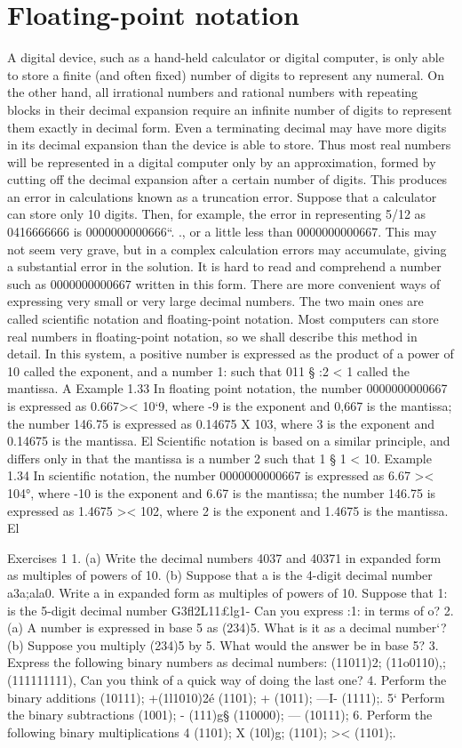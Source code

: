 \section{Floating-point notation}
A digital device, such as a hand-held calculator or digital computer, is only able to store a ﬁnite
(and often ﬁxed) number of digits to represent any numeral. On the other hand, all irrational
numbers and rational numbers with repeating blocks in their decimal expansion require an inﬁnite
number of digits to represent them exactly in decimal form. Even a terminating decimal may have
more digits in its decimal expansion than the device is able to store. Thus most real numbers will
be represented in a digital computer only by an approximation, formed by cutting off the decimal
expansion after a certain number of digits. This produces an error in calculations known as a
truncation error.
Suppose that a calculator can store only 10 digits. Then, for example, the error in representing
5/12 as 0416666666 is 0000000000666“. ., or a little less than 0000000000667. This may not seem
very grave, but in a complex calculation errors may accumulate, giving a substantial error in the
solution.
It is hard to read and comprehend a number such as 0000000000667 written in this form. There are
more convenient ways of expressing very small or very large decimal numbers. The two main ones
are called scientiﬁc notation and ﬂoating-point notation. Most computers can store real numbers
in ﬂoating-point notation, so we shall describe this method in detail. In this system, a positive
number is expressed as the product of a power of 10 called the exponent, and a number 1: such
that 011 § :2 < 1 called the mantissa. A
Example 1.33 In ﬂoating point notation, the number 0000000000667 is expressed as 0.667>< 10‘9,
where -9 is the exponent and 0,667 is the mantissa; the number 146.75 is expressed as 0.14675 X 103,
where 3 is the exponent and 0.14675 is the mantissa. El
Scientiﬁc notation is based on a similar principle, and differs only in that the mantissa is a
number 2 such that 1 § 1 < 10.
Example 1.34 In scientiﬁc notation, the number 0000000000667 is expressed as 6.67 >< 104°,
where -10 is the exponent and 6.67 is the mantissa; the number 146.75 is expressed as 1.4675 >< 102,
where 2 is the exponent and 1.4675 is the mantissa. El

 Exercises 1
1. (a) Write the decimal numbers 4037 and 40371 in expanded form as multiples of powers of
10.
(b) Suppose that a is the 4-digit decimal number a3a;ala0. Write a in expanded form as
multiples of powers of 10. Suppose that 1: is the 5-digit decimal number G3ﬂ2L11£lg1- Can
you express :1: in terms of o?
2. (a) A number is expressed in base 5 as (234)5. What is it as a decimal number‘?
(b) Suppose you multiply (234)5 by 5. What would the answer be in base 5?
3. Express the following binary numbers as decimal numbers:
(11011)2; (11o0110),; (111111111),
Can you think of a quick way of doing the last one?
4. Perform the binary additions
(10111); +(1l1010)2é (1101); + (1011); —I- (1111);.
5‘ Perform the binary subtractions
(1001); - (111)g§ (110000); — (10111);
6. Perform the following binary multiplications 4
(1101); X (10l)g; (1101); >< (1101);.



